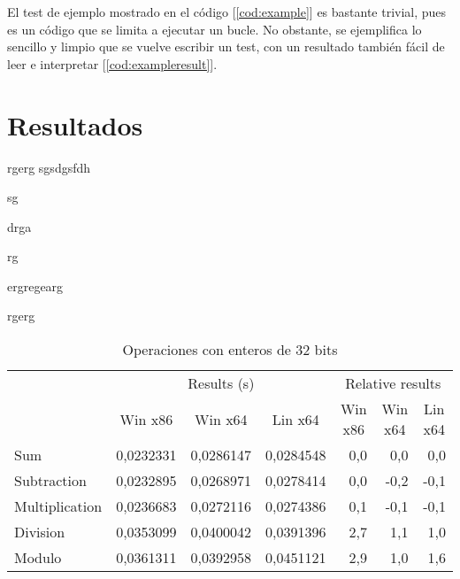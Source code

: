 El test de ejemplo mostrado en el código [\ref{cod:example}] es bastante trivial, pues es un código que se limita a ejecutar un bucle. No obstante, se ejemplifica lo sencillo y limpio que se vuelve escribir un test, con un resultado también fácil de leer e interpretar [\ref{cod:exampleresult}].

\section{Resultados}

rgerg
sgsdgsfdh

sg

drga

rg

ergregearg

rgerg

\begin{table}[h]
\centering
\begin{tabular}{@{}l|rrr|rrr|@{}}
\cmidrule(l){2-7}
                                     & \multicolumn{3}{c|}{Results (s)}                                                               & \multicolumn{3}{c|}{Relative results}                                                      \\ \cmidrule(l){2-7} 
                                     & \multicolumn{1}{c|}{Win x86} & \multicolumn{1}{c|}{Win x64} & \multicolumn{1}{c|}{Lin x64} & \multicolumn{1}{c|}{Win x86} & \multicolumn{1}{c|}{Win x64} & \multicolumn{1}{c|}{Lin x64} \\ \midrule
\multicolumn{1}{|l|}{Sum}            & 0,0232331                    & 0,0286147                    & 0,0284548                    & 0,0                          & 0,0                          & 0,0                          \\ \cmidrule(r){1-1}
\multicolumn{1}{|l|}{Subtraction}    & 0,0232895                    & 0,0268971                    & 0,0278414                    & 0,0                          & -0,2                         & -0,1                         \\ \cmidrule(r){1-1}
\multicolumn{1}{|l|}{Multiplication} & 0,0236683                    & 0,0272116                    & 0,0274386                    & 0,1                          & -0,1                         & -0,1                         \\ \cmidrule(r){1-1}
\multicolumn{1}{|l|}{Division}       & 0,0353099                    & 0,0400042                    & 0,0391396                    & 2,7                          & 1,1                          & 1,0                          \\ \cmidrule(r){1-1}
\multicolumn{1}{|l|}{Modulo}         & 0,0361311                    & 0,0392958                    & 0,0451121                    & 2,9                          & 1,0                          & 1,6                          \\ \bottomrule
\end{tabular}
\caption{Operaciones con enteros de 32 bits}
\end{table}


